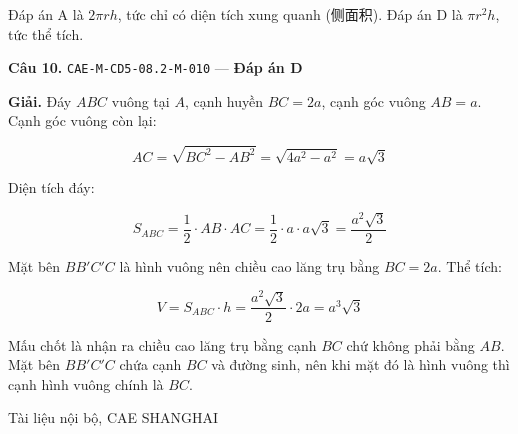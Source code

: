 \documentclass[11pt, a4paper]{article}
\begin{document}
 Đáp án A là $2\pi rh$, tức chỉ có diện tích xung quanh (侧面积). Đáp án D là $\pi r^2 h$, tức thể tích.

\textbf{Câu 10.} \texttt{CAE-M-CD5-08.2-M-010} — \textbf{Đáp án D}

\textbf{Giải.} Đáy $ABC$ vuông tại $A$, cạnh huyền $BC = 2a$, cạnh góc vuông $AB = a$. Cạnh góc vuông còn lại:

$$AC = \sqrt{BC^2 - AB^2} = \sqrt{4a^2 - a^2} = a\sqrt{3}$$

Diện tích đáy:

$$S_{ABC} = \frac{1}{2} \cdot AB \cdot AC = \frac{1}{2} \cdot a \cdot a\sqrt{3} = \frac{a^2\sqrt{3}}{2}$$

Mặt bên $BB'C'C$ là hình vuông nên chiều cao lăng trụ bằng $BC = 2a$. Thể tích:

$$V = S_{ABC} \cdot h = \frac{a^2\sqrt{3}}{2} \cdot 2a = a^3\sqrt{3}$$

 Mấu chốt là nhận ra chiều cao lăng trụ bằng cạnh $BC$ chứ không phải bằng $AB$. Mặt bên $BB'C'C$ chứa cạnh $BC$ và đường sinh, nên khi mặt đó là hình vuông thì cạnh hình vuông chính là $BC$.
\vspace{0.8cm}
\begin{center}
{\footnotesize\color{cae_blue} Tài liệu nội bộ, CAE SHANGHAI}
\end{center}
\end{document}
